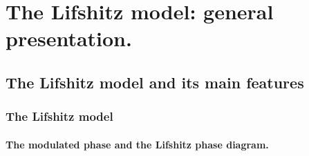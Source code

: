 
\chapter{The Lifshitz model: general presentation.}

\section{The Lifshitz model and its main features}

\subsection{The Lifshitz model}

\subsubsection{The modulated phase and the Lifshitz phase diagram.}

